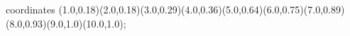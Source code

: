 					coordinates { (1.0,0.18)(2.0,0.18)(3.0,0.29)(4.0,0.36)(5.0,0.64)(6.0,0.75)(7.0,0.89)(8.0,0.93)(9.0,1.0)(10.0,1.0)};